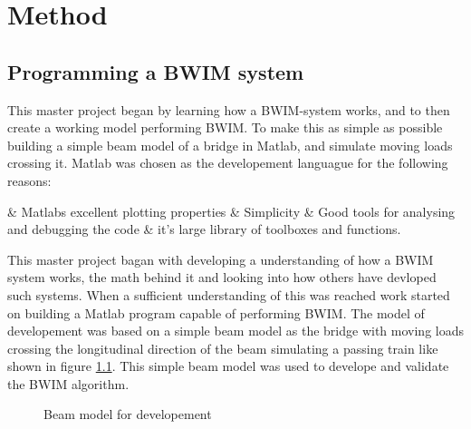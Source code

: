 \chapter{Method}

\section{Programming a BWIM system}
This master project began by learning how a BWIM-system works, and to then create a working model performing BWIM. To make this as simple as possible building a simple beam model of a bridge in Matlab, and simulate moving loads crossing it.
Matlab was chosen as the developement languague for the following reasons:
\begin{easylist}[itemize]
	& Matlabs excellent plotting properties
	& Simplicity
	& Good tools for analysing and debugging the code
	& it's large library of toolboxes and functions.
\end{easylist}

This master project bagan with developing a understanding of how a BWIM system works, the math behind it and looking into how others have devloped such systems. When a sufficient understanding of this was reached work started on building a Matlab program capable of performing BWIM. The model of developement was based on a simple beam model as the bridge with  moving loads crossing the longitudinal direction of the beam simulating a passing train like shown in figure \ref{figure:beam_model}.
This simple beam model was used to develope and validate the BWIM algorithm.
\begin{figure}[htpb]
	\centering
	\caption{Beam model for developement}
	\label{figure:beam_model}
\end{figure}

